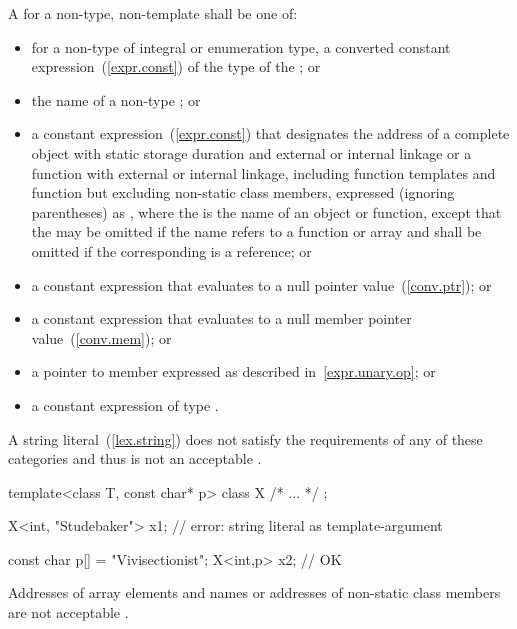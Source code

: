 \pnum
A
for a non-type, non-template
shall be one of:
\begin{itemize}
\item
for a non-type  of integral or enumeration type,
a converted
constant expression~(\ref{expr.const})
of the type of the ; or
\item
the name of a non-type
;
or
\item
a constant expression~(\ref{expr.const}) that designates
the address of a complete object
with static storage duration and external or internal linkage
or a function with external or internal linkage,
including function templates and function
but
excluding non-static class members, expressed (ignoring parentheses) as
\tcode{\&}
,
where the  is the name of an object or function,
except that the \tcode{\&}
may be omitted if the name refers to a function or
array and shall be omitted if the corresponding
is a reference;
or
\item
a constant expression that evaluates to a null pointer
value~(\ref{conv.ptr});
or
\item
a constant expression that evaluates to a null member pointer
value~(\ref{conv.mem});
or
\item
a pointer to member expressed as described in~\ref{expr.unary.op};
or
\item
a constant expression of type .
\end{itemize}

\pnum
\enternote
A string literal~(\ref{lex.string})
does not satisfy the requirements of any of these
categories and thus is not an acceptable
.
\enterexample

\begin{codeblock}
template<class T, const char* p> class X {
  /* ... */
};

X<int, "Studebaker"> x1;        // error: string literal as template-argument

const char p[] = "Vivisectionist";
X<int,p> x2;                    // OK
\end{codeblock}
\exitexample
\exitnote

\pnum
\enternote
Addresses of array elements and names or addresses of non-static class
members are not acceptable
.
\enterexample

